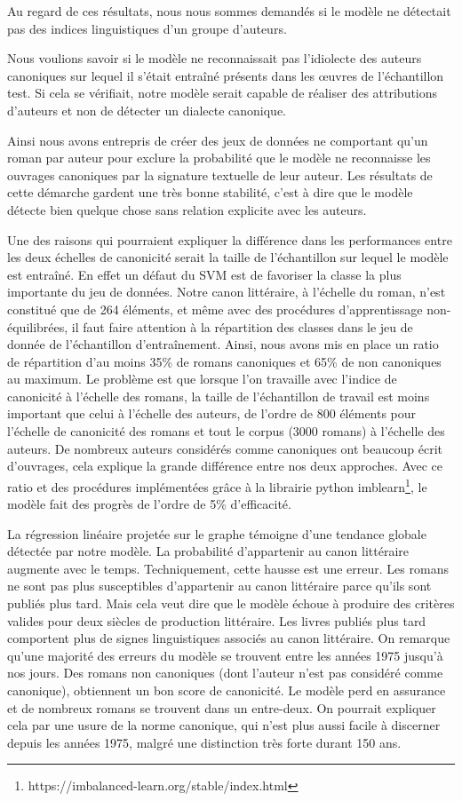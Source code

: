Au regard de ces résultats, nous nous sommes demandés si le modèle ne détectait pas des indices linguistiques d'un groupe d'auteurs. 

Nous voulions savoir si le modèle ne reconnaissait pas l'idiolecte des auteurs canoniques sur lequel il s'était entraîné présents dans les œuvres de l'échantillon test. Si cela se vérifiait, notre modèle serait capable de réaliser des attributions d'auteurs et non de détecter un dialecte canonique. 

Ainsi nous avons entrepris de créer des jeux de données ne comportant qu'un roman par auteur pour exclure la probabilité que le modèle ne reconnaisse les ouvrages canoniques par la signature textuelle de leur auteur. Les résultats de cette démarche gardent une très bonne stabilité, c'est à dire que le modèle détecte bien quelque chose sans relation explicite avec les auteurs. 

Une des raisons qui pourraient expliquer la différence dans les performances entre les deux échelles de canonicité serait la taille de l'échantillon sur lequel le modèle est entraîné. En effet un défaut du SVM est de favoriser la classe la plus importante du jeu de données. Notre canon littéraire, à l'échelle du roman, n'est constitué que de 264 éléments, et même avec des procédures d'apprentissage non-équilibrées, il faut faire attention à la répartition des classes dans le jeu de donnée de l'échantillon d'entraînement. Ainsi, nous avons mis en place un ratio de répartition d'au moins 35\% de romans canoniques et 65\% de non canoniques au maximum. Le problème est que lorsque l'on travaille avec l'indice de canonicité à l'échelle des romans, la taille de l'échantillon de travail est moins important que celui à l'échelle des auteurs, de l'ordre de 800 éléments pour l'échelle de canonicité des romans et tout le corpus (3000 romans) à l'échelle des auteurs. De nombreux auteurs considérés comme canoniques ont beaucoup écrit d'ouvrages, cela explique la grande différence entre nos deux approches. Avec ce ratio et des procédures implémentées grâce à la librairie python imblearn\footnote{https://imbalanced-learn.org/stable/index.html}, le modèle fait des progrès de l'ordre de 5\% d'efficacité.

La régression linéaire projetée sur le graphe témoigne d'une tendance globale détectée par notre modèle. La probabilité d'appartenir au canon littéraire augmente avec le temps. Techniquement, cette hausse est une erreur. Les romans ne sont pas plus susceptibles d'appartenir au canon littéraire parce qu'ils sont publiés plus tard. Mais cela veut dire que le modèle échoue à produire des critères valides pour deux siècles de production littéraire. Les livres publiés plus tard comportent plus de signes linguistiques associés au canon littéraire. On remarque qu'une majorité des erreurs du modèle se trouvent entre les années 1975 jusqu'à nos jours. Des romans non canoniques (dont l'auteur n'est pas considéré comme canonique), obtiennent un bon score de canonicité. Le modèle perd en assurance et de nombreux romans se trouvent dans un entre-deux. On pourrait expliquer cela par une usure de la norme canonique, qui n'est plus aussi facile à discerner depuis les années 1975, malgré une distinction très forte durant 150 ans. 

